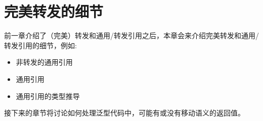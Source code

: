 \chapter{完美转发的细节}
前一章介绍了（完美）转发和通用/转发引用之后，本章会来介绍完美转发和通用/转发引用的细节，例如:

\begin{itemize}
	\item 非转发的通用引用
	\item 通用引用
	\item 通用引用的类型推导
\end{itemize}

接下来的章节将讨论如何处理泛型代码中，可能有或没有移动语义的返回值。





















